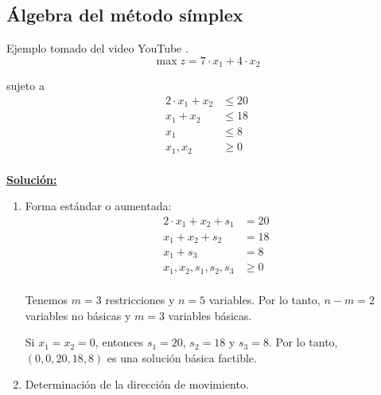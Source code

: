 \documentclass[../main.tex]{subfiles}
\begin{document}
    \subsection{Álgebra del método símplex}
        \begin{example} Ejemplo tomado del video YouTube \cite{metodo_simplex_algebraico}.
            \begin{equation}
                \max z = 7 \cdot x_1 + 4 \cdot x_2
            \end{equation}

            sujeto a
            \begin{equation}
                \begin{aligned}
                    2 \cdot x_1 + x_2 &\leq 20 \\
                    x_1 + x_2 &\leq 18 \\
                    x_1  &\leq 8 \\
                    x_1, x_2 &\geq 0 \\
                \end{aligned}
            \end{equation}

            \underline{\textbf{Solución:}}
            \begin{enumerate}
                \item  Forma estándar o aumentada:
                    \begin{equation}
                        \begin{aligned}
                            2 \cdot x_1 + x_2 + s_1 &= 20 \\
                            x_1 + x_2 + s_2 &= 18 \\
                            x_1 + s_3 &= 8 \\
                            x_1, x_2, s_1, s_2, s_3 &\geq 0 \\
                        \end{aligned}
                    \end{equation}
                    
                    Tenemos $m = 3$ restricciones y $n = 5$ variables. Por lo tanto, $n-m = 2$ variables no básicas y $m = 3$ variables básicas.

                    Si $x_1 = x_2 = 0$, entonces $s_1 = 20$, $s_2 = 18$ y $s_3 = 8$. Por lo tanto, $(0,0,20,18,8)$ es una solución básica factible.
                \item Determinación de la dirección de movimiento.
 

\end{enumerate}
\end{example}
\end{document}
